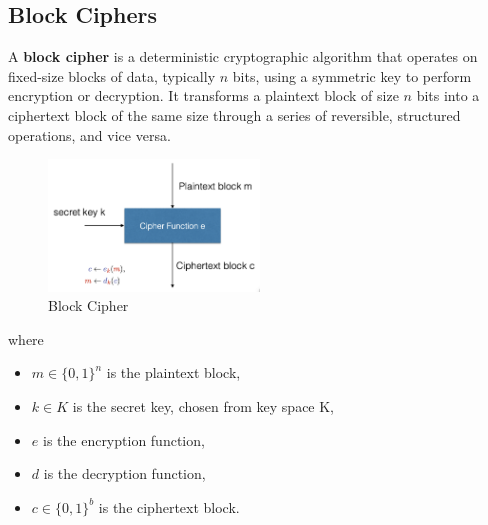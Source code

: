 \subsection{Block Ciphers}
\begin{defn}
A \textbf{block cipher} is a deterministic cryptographic algorithm that operates on fixed-size blocks of data, typically \( n \) bits, using a symmetric key to perform encryption or decryption. It transforms a plaintext block of size \( n \) bits into a ciphertext block of the same size through a series of reversible, structured operations, and vice versa.


\end{defn}
\begin{figure}[h!]
    \centering
    \includegraphics[width=0.5\textwidth]{img/blockcipher.png}
    \caption{Block Cipher}
    \label{fig:block_cipher}
\end{figure}

where
\begin{itemize}
    \item $m \in \{0,1\}^n$ is the plaintext block,
    \item $k \in K$ is the secret key, chosen from key space K,
    \item $e$ is the encryption function,
    \item $d$ is the decryption function,
    \item $c \in \{0,1\}^b$ is the ciphertext block.
\end{itemize}

